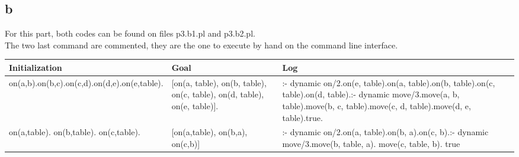 \documentclass{article}
\begin{document}
        \subsection{b}
            For this part, both codes can be found on files p3.b1.pl and p3.b2.pl.\\
            The two last command are commented, they are the one to execute by hand on the command line interface.\\
            \begin{tabular}{|p{3cm}|p{6cm}|p{3cm}|}
                \hline
                \textbf{Initialization} & \textbf{Goal} & \textbf{Log}\\
                \hline
                    on(a,b).\newline on(b,c).\newline on(c,d).\newline on(d,e).\newline on(e,table). &
                    [on(a, table), on(b, table), on(c, table), on(d, table), on(e, table)].&
                    :- dynamic on/2.\newline on(e, table).\newline on(a, table).\newline on(b, table).\newline on(c, table).\newline on(d, table).\newline :- dynamic move/3.\newline move(a, b, table).\newline move(b, c, table).\newline move(c, d, table).\newline move(d, e, table).\newline true.\\
                \hline
                    on(a,table). \newline on(b,table). \newline on(c,table).  &
                    [on(a,table), on(b,a), on(c,b)] &
                    :- dynamic on/2.\newline on(a, table).\newline on(b, a).\newline on(c, b).\newline :- dynamic move/3.\newline move(b, table, a). \newline move(c, table, b). \newline true\\
                \hline
            \end{tabular}
\end{document}
